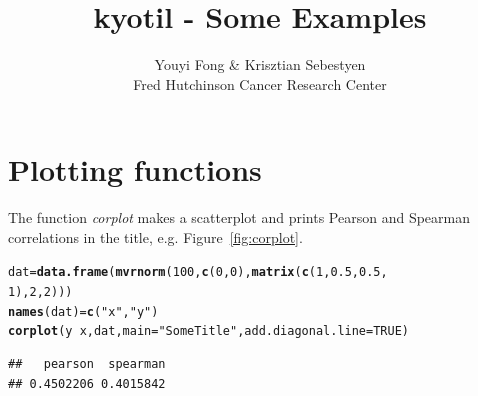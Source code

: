 \documentclass{article}\usepackage[]{graphicx}\usepackage[]{color}
\makeatletter
\newcommand{\hlnum}[1]{\textcolor[rgb]{0.686,0.059,0.569}{#1}}%
\newcommand{\hlstr}[1]{\textcolor[rgb]{0.192,0.494,0.8}{#1}}%
\newcommand{\hlopt}[1]{\textcolor[rgb]{0,0,0}{#1}}%
\newcommand{\hlstd}[1]{\textcolor[rgb]{0.345,0.345,0.345}{#1}}%
\newcommand{\hlkwb}[1]{\textcolor[rgb]{0.69,0.353,0.396}{#1}}%
\newcommand{\hlkwc}[1]{\textcolor[rgb]{0.333,0.667,0.333}{#1}}%
\newcommand{\hlkwd}[1]{\textcolor[rgb]{0.737,0.353,0.396}{\textbf{#1}}}%
\newenvironment{kframe}{%
 \def\at@end@of@kframe{}%
 \ifinner\ifhmode%
  \def\at@end@of@kframe{\end{minipage}}%
  \begin{minipage}{\columnwidth}%
 \fi\fi%
 \def\FrameCommand##1{\hskip\@totalleftmargin \hskip-\fboxsep
 \colorbox{shadecolor}{##1}\hskip-\fboxsep
     \hskip-\linewidth \hskip-\@totalleftmargin \hskip\columnwidth}%
 \MakeFramed {\advance\hsize-\width
   \@totalleftmargin\z@ \linewidth\hsize
   \@setminipage}}%
 {\par\unskip\endMakeFramed%
 \at@end@of@kframe}
\newenvironment{knitrout}{}{} %
\makeatother
\begin{document}
\title{kyotil - Some Examples}
\author{Youyi Fong \& Krisztian Sebestyen\\Fred Hutchinson Cancer Research Center}
\maketitle






\section{Plotting functions}

The function \textit{corplot} makes a scatterplot and prints Pearson and Spearman correlations in the title, e.g. Figure~\ref{fig:corplot}.

\begin{knitrout}
\color{fgcolor}\begin{kframe}
\begin{alltt}
\hlstd{dat} \hlkwb{=} \hlkwd{data.frame}\hlstd{(}\hlkwd{mvrnorm}\hlstd{(}\hlnum{100}\hlstd{,} \hlkwd{c}\hlstd{(}\hlnum{0}\hlstd{,} \hlnum{0}\hlstd{),} \hlkwd{matrix}\hlstd{(}\hlkwd{c}\hlstd{(}\hlnum{1}\hlstd{,} \hlnum{0.5}\hlstd{,} \hlnum{0.5}\hlstd{,}
    \hlnum{1}\hlstd{),} \hlnum{2}\hlstd{,} \hlnum{2}\hlstd{)))}
\hlkwd{names}\hlstd{(dat)} \hlkwb{=} \hlkwd{c}\hlstd{(}\hlstr{"x"}\hlstd{,} \hlstr{"y"}\hlstd{)}
\hlkwd{corplot}\hlstd{(y} \hlopt{~} \hlstd{x, dat,} \hlkwc{main} \hlstd{=} \hlstr{"Some Title"}\hlstd{,} \hlkwc{add.diagonal.line} \hlstd{=} \hlnum{TRUE}\hlstd{)}
\end{alltt}
\begin{verbatim}
##   pearson  spearman 
## 0.4502206 0.4015842
\end{verbatim}
\end{kframe}\begin{figure}[tbp]


\end{figure}
\end{knitrout}
\end{document}
